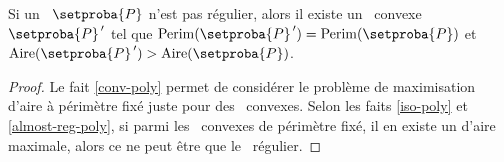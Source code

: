 

\begin{fact} \label{nece-cond}
	Si un \ngone\ $\setproba{P}$ n'est pas régulier,
	alors il existe un \ngone\ convexe $\setproba{P}^{\,\prime}$ tel que
	$\perim{\setproba{P}^{\,\prime}} = \perim{\setproba{P}}$
	et
	$\area{\setproba{P}^{\,\prime}} > \area{\setproba{P}}$.
\end{fact}


\begin{proof}
	Le fait \ref{conv-poly} permet de considérer le problème de maximisation d'aire à périmètre fixé juste pour des \ngones\ convexes.
	Selon les faits \ref{iso-poly} et \ref{almost-reg-poly}, si parmi les \ngones\ convexes de périmètre fixé, il en existe un d'aire maximale, alors ce ne peut être que le \ngone\ régulier.
\end{proof}
